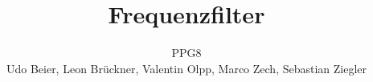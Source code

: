 


\title{Frequenzfilter}
\date{}
\author{PPG8\\
Udo Beier, Leon Brückner, Valentin Olpp, Marco Zech, Sebastian Ziegler}
\listoffigures






